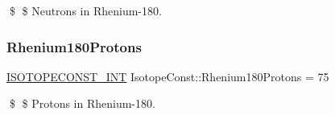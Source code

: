 \$ \$ Neutrons in Rhenium-\/180. \mbox{\label{group___isotope_const-_rhenium-_re180_ga4153861e990bcd2d0127f8ce9737bca9}} 
\subsubsection{\texorpdfstring{Rhenium180\+Protons}{Rhenium180Protons}}
{\footnotesize\ttfamily \mbox{\hyperlink{group___isotope_const-_macros_ga5f18360b3e99483a35c32d789e62621c}{I\+S\+O\+T\+O\+P\+E\+C\+O\+N\+S\+T\+\_\+\+I\+NT}} Isotope\+Const\+::\+Rhenium180\+Protons = 75}

\$ \$ Protons in Rhenium-\/180. 